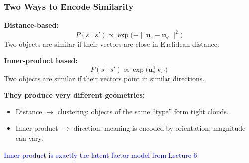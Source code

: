 \documentclass[notes,11pt, aspectratio=169]{beamer}
\newcommand{\vu}{\mathbf{u}}
\newcommand{\vv}{\mathbf{v}}
\begin{document}
\begin{frame}
\frametitle{Two Ways to Encode Similarity}

\textbf{Distance-based:}
\[
    P(s \mid s') \propto \exp\bigl(-\|\vu_s - \vu_{s'}\|^2\bigr)
\]
Two objects are similar if their vectors are close in Euclidean distance.

\vspace{8pt}
\textbf{Inner-product based:}
\[
    P(s \mid s') \propto \exp\bigl(\vu_s^\top \vv_{s'}\bigr)
\]
Two objects are similar if their vectors point in similar directions.

\vspace{8pt}
\textbf{They produce very different geometries:}
\begin{itemize}
    \item Distance $\to$ clustering: objects of the same ``type'' form tight clouds.
    \item Inner product $\to$ direction: meaning is encoded by orientation, magnitude can vary.
\end{itemize}

\vspace{4pt}
\textcolor{blue}{Inner product is exactly the latent factor model from Lecture 6.}
\end{frame}
\end{document}

